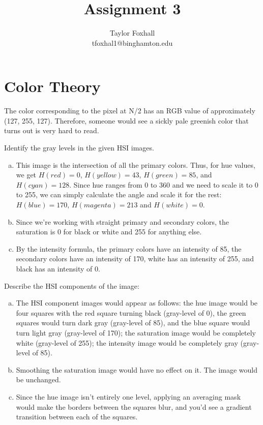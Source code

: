 \documentclass[12pt]{article}
\newenvironment{question}[2][Question]{\begin{trivlist}
\item[\hskip \labelsep{\bfseries #1}\hskip \labelsep{\bfseries #2.}]}{\end{trivlist}}
\begin{document}
 
\title{Assignment 3}
\author{Taylor Foxhall\\
tfoxhal1@binghamton.edu}
 
\maketitle

\section{Color Theory}

\begin{question}[1] {6.5}
The color corresponding to the pixel at N/2 has an RGB value of approximately
(127, 255, 127). Therefore, someone would see \textcolor{q1color}{a sickly pale
  greenish color} that turns out is very hard to read.
\end{question}

\begin{question}[2] {6.16}
Identify the gray levels in the given HSI images.
\begin{enumerate}[(a)]
  \item This image is the intersection of all the primary colors. Thus, for hue
    values, we get $H(red) = 0$, $H(yellow) = 43$, $H(green) = 85$, and $H(cyan) =
    128$. Since hue ranges from 0 to 360 and we need to scale it to 0 to 255, we
    can simply calculate the angle and scale it for the rest: $H(blue) = 170$,
    $H(magenta) = 213$ and $H(white) = 0$.
  \item Since we're working with straight primary and secondary colors, the
    saturation is 0 for black or white and 255 for anything else.
  \item By the intensity formula, the primary colors have an intensity of 85,
    the secondary colors have an intensity of 170, white has an intensity of
    255, and black has an intensity of 0.
\end{enumerate}
\end{question}

\begin{question}[3] {6.20}
Describe the HSI components of the image:
\begin{enumerate}[(a)]
  \item The HSI component images would appear as follows: the hue image would be
    four squares with the red square turning black (gray-level of 0), the green
    squares would turn dark gray (gray-level of 85), and the blue square would
    turn light gray (gray-level of 170); the saturation image would be completely
    white (gray-level of 255); the intensity image would be completely gray
    (gray-level of 85).
  \item Smoothing the saturation image would have no effect on it. The image
    would be unchanged.
  \item Since the hue image isn't entirely one level, applying an averaging mask
    would make the borders between the squares blur, and you'd see a gradient
    transition between each of the squares. 
\end{enumerate}
\end{question}
 
\end{document}
